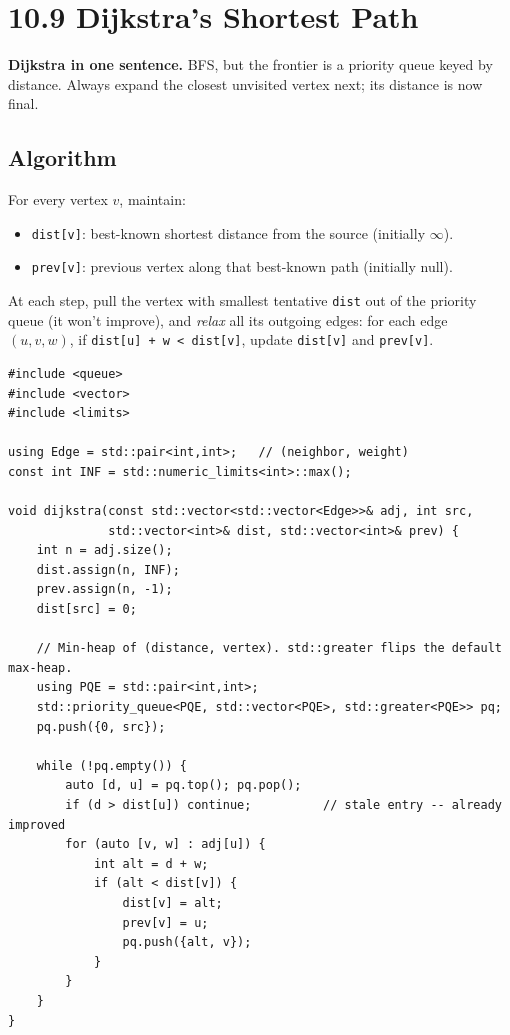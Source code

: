 \documentclass[11pt]{article}
\begin{document}
\section{10.9 Dijkstra's Shortest Path}

\begin{ideabox}
\textbf{Dijkstra in one sentence.} BFS, but the frontier is a priority queue keyed by distance. Always expand the closest unvisited vertex next; its distance is now final.
\end{ideabox}

\subsection*{Algorithm}

For every vertex $v$, maintain:
\begin{itemize}[leftmargin=*]
    \item \texttt{dist[v]}: best-known shortest distance from the source (initially $\infty$).
    \item \texttt{prev[v]}: previous vertex along that best-known path (initially null).
\end{itemize}

At each step, pull the vertex with smallest tentative \texttt{dist} out of the priority queue (it won't improve), and \emph{relax} all its outgoing edges: for each edge $(u, v, w)$, if \texttt{dist[u] + w < dist[v]}, update \texttt{dist[v]} and \texttt{prev[v]}.

\begin{lstlisting}[basicstyle=\ttfamily\small,frame=single]
#include <queue>
#include <vector>
#include <limits>

using Edge = std::pair<int,int>;   // (neighbor, weight)
const int INF = std::numeric_limits<int>::max();

void dijkstra(const std::vector<std::vector<Edge>>& adj, int src,
              std::vector<int>& dist, std::vector<int>& prev) {
    int n = adj.size();
    dist.assign(n, INF);
    prev.assign(n, -1);
    dist[src] = 0;

    // Min-heap of (distance, vertex). std::greater flips the default max-heap.
    using PQE = std::pair<int,int>;
    std::priority_queue<PQE, std::vector<PQE>, std::greater<PQE>> pq;
    pq.push({0, src});

    while (!pq.empty()) {
        auto [d, u] = pq.top(); pq.pop();
        if (d > dist[u]) continue;          // stale entry -- already improved
        for (auto [v, w] : adj[u]) {
            int alt = d + w;
            if (alt < dist[v]) {
                dist[v] = alt;
                prev[v] = u;
                pq.push({alt, v});
            }
        }
    }
}
\end{lstlisting}
\end{document}
